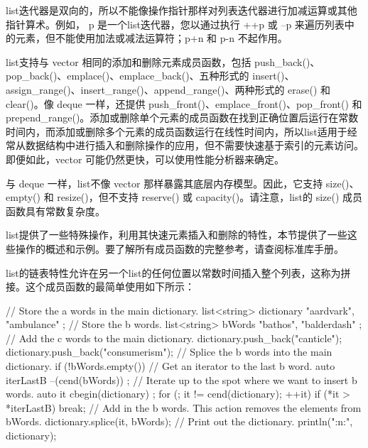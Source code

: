 
list迭代器是双向的，所以不能像操作指针那样对列表迭代器进行加减运算或其他指针算术。例如， p 是一个list迭代器，您以通过执行 ++p 或 --p 来遍历列表中的元素，但不能使用加法或减法运算符；p+n 和 p-n 不起作用。


list支持与 vector 相同的添加和删除元素成员函数，包括 push\_back()、pop\_back()、emplace()、emplace\_back()、五种形式的 insert()、assign\_range()、insert\_range()、append\_range()、两种形式的 erase() 和 clear()。像 deque 一样，还提供 push\_front()、emplace\_front()、pop\_front() 和 prepend\_range()。添加或删除单个元素的成员函数在找到正确位置后运行在常数时间内，而添加或删除多个元素的成员函数运行在线性时间内，所以list适用于经常从数据结构中进行插入和删除操作的应用，但不需要快速基于索引的元素访问。即便如此，vector 可能仍然更快，可以使用性能分析器来确定。


与 deque 一样，list不像 vector 那样暴露其底层内存模型。因此，它支持 size()、empty() 和 resize()，但不支持 reserve() 或 capacity()。请注意，list的 size() 成员函数具有常数复杂度。


list提供了一些特殊操作，利用其快速元素插入和删除的特性，本节提供了一些这些操作的概述和示例。要了解所有成员函数的完整参考，请查阅标准库手册。


list的链表特性允许在另一个list的任何位置以常数时间插入整个列表，这称为拼接。这个成员函数的最简单使用如下所示：

\begin{cpp}
// Store the a words in the main dictionary.
list<string> dictionary { "aardvark", "ambulance" };
// Store the b words.
list<string> bWords { "bathos", "balderdash" };
// Add the c words to the main dictionary.
dictionary.push_back("canticle");
dictionary.push_back("consumerism");
// Splice the b words into the main dictionary.
if (!bWords.empty()) {
    // Get an iterator to the last b word.
    auto iterLastB { --(cend(bWords)) };
    // Iterate up to the spot where we want to insert b words.
    auto it { cbegin(dictionary) };
    for (; it != cend(dictionary); ++it) {
        if (*it > *iterLastB) { break; }
    }
    // Add in the b words. This action removes the elements from bWords.
    dictionary.splice(it, bWords);
}
// Print out the dictionary.
println("{:n:}", dictionary);
\end{cpp}

